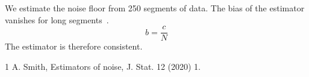 \documentclass{article}
\begin{document}
We estimate the noise floor from 250 segments of data.
The bias of the estimator vanishes for long segments~\cite{smith2020}.
\begin{equation}
  b = \frac{c}{N} \label{eq:bias}
\end{equation}
The estimator is therefore consistent.
\begin{thebibliography}{1}
 A. Smith, Estimators of noise, J. Stat. 12 (2020) 1.
\end{thebibliography}
\end{document}
